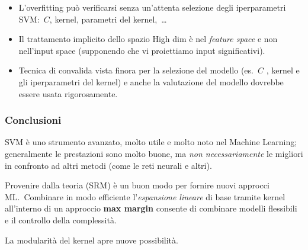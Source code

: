 \begin{itemize}
	\item L'overfitting può verificarsi senza un'attenta selezione degli iperparametri SVM:\ $C$, kernel, parametri del kernel,\ \dots
	\item Il trattamento implicito dello spazio High dim è nel \textit{feature space} e non nell'input space (supponendo che vi proiettiamo input significativi).\

	\item Tecnica di convalida vista finora per la selezione del modello (es.\ $C$ , kernel e gli iperparametri del kernel) e anche la valutazione del modello dovrebbe essere usata rigorosamente.\
\end{itemize}

\subsubsection{Conclusioni}

SVM è uno strumento avanzato, molto utile e molto noto nel Machine Learning; generalmente le prestazioni sono molto buone, ma \textit{non necessariamente} le migliori in confronto ad altri metodi (come le reti neurali e altri).\

Provenire dalla teoria (SRM) è un buon modo per fornire nuovi approcci ML.\
Combinare in modo efficiente l'\textit{espansione lineare} di base tramite kernel all'interno di un approccio \textbf{max margin} consente di combinare modelli flessibili e il controllo della complessità.\

La modularità del kernel apre nuove possibilità.\
